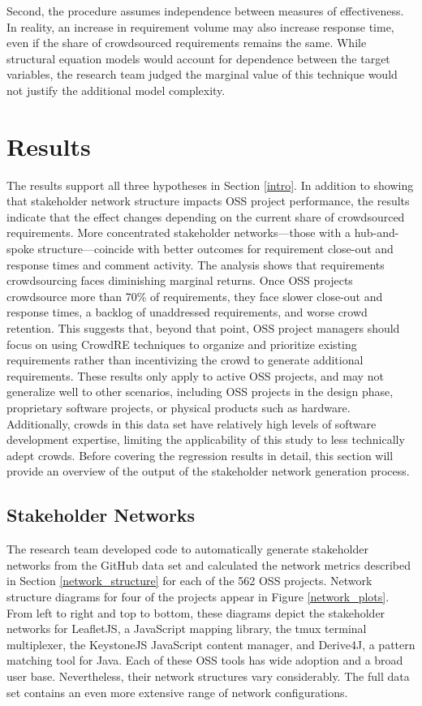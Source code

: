 Second, the procedure assumes independence between measures of effectiveness. In reality, an increase in requirement volume may also increase response time, even if the share of crowdsourced requirements remains the same. While structural equation models \cite{ullman} would account for dependence between the target variables, the research team judged the marginal value of this technique would not justify the additional model complexity. 

\section{Results}

\label{results_section}

The results support all three hypotheses in Section \ref{intro}. In addition to showing that stakeholder network structure impacts OSS project performance, the results indicate that the effect changes depending on the current share of crowdsourced requirements. More concentrated stakeholder networks---those with a hub-and-spoke structure---coincide with better outcomes for requirement close-out and response times and comment activity. The analysis shows that requirements crowdsourcing faces diminishing marginal returns. Once OSS projects crowdsource more than 70\% of requirements, they face slower close-out and response times, a backlog of unaddressed requirements, and worse crowd retention. This suggests that, beyond that point, OSS project managers should focus on using CrowdRE techniques to organize and prioritize existing requirements rather than incentivizing the crowd to generate additional requirements. These results only apply to active OSS projects, and may not generalize well to other scenarios, including OSS projects in the design phase, proprietary software projects, or physical products such as hardware. Additionally, crowds in this data set have relatively high levels of software development expertise, limiting the applicability of this study to less technically adept crowds. Before covering the regression results in detail, this section will provide an overview of the output of the stakeholder network generation process.

\subsection{Stakeholder Networks}

The research team developed code to automatically generate stakeholder networks from the GitHub data set and calculated the network metrics described in Section \ref{network_structure} for each of the 562 OSS projects. Network structure diagrams for four of the projects appear in Figure \ref{network_plots}. From left to right and top to bottom, these diagrams depict the stakeholder networks for LeafletJS, a JavaScript mapping library, the tmux terminal multiplexer, the KeystoneJS JavaScript content manager, and Derive4J, a pattern matching tool for Java. Each of these OSS tools has wide adoption and a broad user base. Nevertheless, their network structures vary considerably. The full data set contains an even more extensive range of network configurations.

